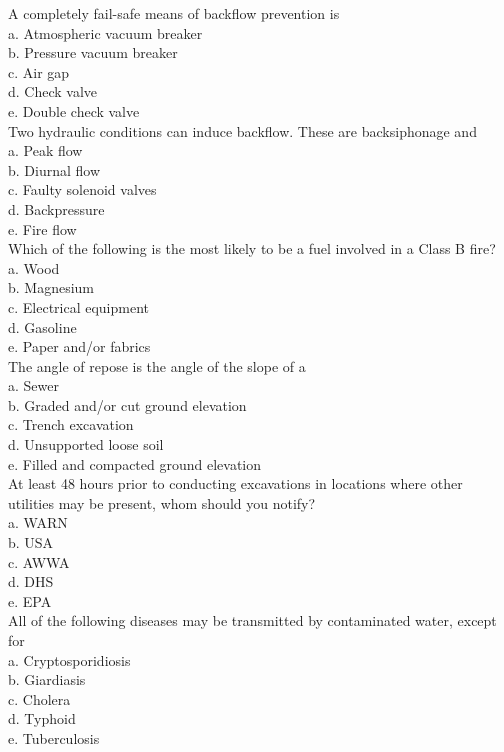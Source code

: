 A completely fail-safe means of backflow prevention is\\
a. Atmospheric vacuum breaker\\
b. Pressure vacuum breaker\\
c. Air gap\\
d. Check valve\\
e. Double check valve\\

Two hydraulic conditions can induce backflow. These are backsiphonage and\\
a. Peak flow\\
b. Diurnal flow\\
c. Faulty solenoid valves\\
d. Backpressure\\
e. Fire flow\\

Which of the following is the most likely to be a fuel involved in a Class B fire?\\
a. Wood\\
b. Magnesium\\
c. Electrical equipment\\
d. Gasoline\\
e. Paper and/or fabrics\\

The angle of repose is the angle of the slope of a\\
a. Sewer\\
b. Graded and/or cut ground elevation\\
c. Trench excavation\\
d. Unsupported loose soil\\
e. Filled and compacted ground elevation\\

At least 48 hours prior to conducting excavations in locations where other utilities may be present, whom should you notify?\\
a. WARN\\
b. USA\\
c. AWWA\\
d. DHS\\
e. EPA\\

All of the following diseases may be transmitted by contaminated water, except for\\
a. Cryptosporidiosis\\
b. Giardiasis\\
c. Cholera\\
d. Typhoid\\
e. Tuberculosis\\

